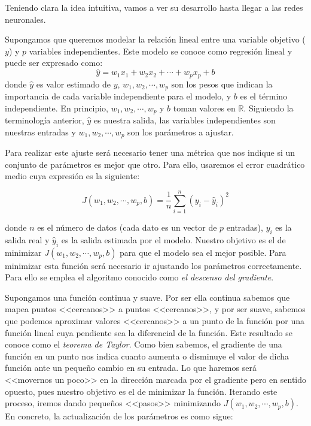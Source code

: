 \documentclass[12pt, a4paper, twoside]{book}
\numberwithin{equation}{section}
\theoremstyle{definition}
\theoremstyle{remark}
\theoremstyle{plain}
\begin{document}
	Teniendo clara la idea intuitiva, vamos a ver su desarrollo hasta 
	llegar a las redes neuronales.

	Supongamos que queremos modelar la relación lineal entre una variable
	objetivo ($y$) y $p$ variables independientes. Este modelo se conoce 
	como regresión lineal y puede ser expresado como:
	\begin{equation*}
		\hat{y}=w_{1}x_{1}+w_{2}x_{2}+\cdots+w_{p}x_{p}+b
	\end{equation*}
	donde $\hat{y}$ es valor estimado de $y$, $w_{1},w_{2},\cdots,w_{p}$ 
	son los pesos que indican la importancia de cada variable 
	independiente para el modelo, y $b$ es el término independiente. En 
	principio, $w_{1},w_{2},\cdots,w_{p}$ y $b$ toman valores en 
	$\mathbb{R}$.
	Siguiendo la terminología anterior, $\hat{y}$ es nuestra salida, las 
	variables independientes son nuestras entradas y $w_{1},w_{2},\cdots,
	w_{p}$ son los parámetros a ajustar. 

	Para realizar este ajuste será necesario tener una métrica que nos 
	indique si un conjunto de parámetros es mejor que otro. Para ello,
	usaremos el error cuadrático medio cuya expresión es la siguiente:

	\begin{equation*}
		J(w_{1},w_{2},\cdots,w_{p},b)=\frac{1}{n}\sum_{i=1}^{n}(y_{i}-\hat{y}_{i})^2
	\end{equation*}

	donde $n$ es el número de datos (cada dato es un vector de $p$ 
	entradas), $y_{i}$ es la salida real y 
	$\hat{y}_{i}$ es la salida estimada por el modelo. Nuestro objetivo
	es el de minimizar $J(w_{1},w_{2},\cdots,w_{p},b)$ para que el modelo 
	sea el mejor posible. 
	Para minimizar esta función será necesario ir ajustando los parámetros 
	correctamente. Para ello se emplea el algoritmo conocido como 
	\emph{el descenso del gradiente}.

	Supongamos una función continua y suave. Por ser ella continua sabemos
	que mapea puntos <<cercanos>> a puntos <<cercanos>>, y por ser suave,
	sabemos que podemos aproximar valores <<cercanos>> a un punto de la 
	función por una función lineal cuya pendiente sea la diferencial de la 
	función. Este resultado se conoce como el \emph{teorema de Taylor}. 
	Como bien sabemos, el gradiente de una función en un punto 
	nos indica cuanto aumenta o disminuye el valor 
	de dicha función ante un pequeño cambio en su entrada. Lo que haremos 
	será <<movernos un poco>> en la dirección marcada por el gradiente 
	pero en sentido opuesto, pues nuestro objetivo 
	es el de minimizar la función. Iterando este proceso,
	iremos dando pequeños <<pasos>> minimizando $J(w_{1},w_{2},\cdots,
	w_{p},b)$. En concreto, la 
	actualización de los parámetros es como sigue:
	
\end{document}
